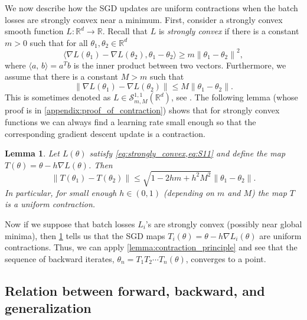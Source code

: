 \documentclass[10pt]{article} %
\theoremstyle{plain}
\newtheorem{lemma}[theorem]{Lemma}
\theoremstyle{definition}
\theoremstyle{remark}
\begin{document}
We now describe how the SGD updates are uniform contractions when the batch losses are strongly convex near a minimum.
First, consider a strongly convex smooth function $L:\mathbb{R}^d \to \mathbb{R}$. Recall that $L$ is \emph{strongly convex} if there is a constant $m>0$ such that for all $\theta_1,\theta_2 \in \mathbb{R}^d$
\begin{equation} \label{eq:strongly_convex}
    \langle \nabla L(\theta_1) - \nabla L(\theta_2), \theta_1-\theta_2 \rangle \geq m \left \| \theta_1-\theta_2 \right \|^2,
\end{equation}
where $\langle a, \,b\rangle = a^T b$ is the inner product between two vectors. Furthermore, we assume that there is a constant $M > m$ such that
\begin{equation}\label{eq:S11}
    \left \| \nabla L(\theta_1) - \nabla L(\theta_2) \right \| \leq M \left \| \theta_1-\theta_2 \right \|.
\end{equation}
This is sometimes denoted as $L \in \mathcal{S}_{m,M}^{1,1}(\mathbb{R}^d)$, see \cite{nesterov}.
The following lemma (whose proof is in \cref{appendix:proof_of_contraction}) shows that for strongly convex functions we can always find a learning rate small enough so that the corresponding gradient descent update is a contraction. 
\begin{lemma} \label{lem:contraction}
    Let $L(\theta)$ satisfy \cref{eq:strongly_convex,eq:S11} and define the map $T(\theta)=\theta-h\nabla L(\theta)$.
    Then
    \begin{equation*}
        \left \| T(\theta_1)-T(\theta_2) \right \| \leq \sqrt{1 - 2 h m + h^2 M^2} \left \| \theta_1-\theta_2 \right \|.
    \end{equation*}
    In particular, for small enough $h \in (0,1)$ (depending on $m$ and $M$) the map $T$ is a uniform contraction.
\end{lemma}


Now if we suppose that batch losses $L_i$'s are strongly convex (possibly near global minima), then \cref{lem:contraction} tells us that the SGD maps $T_i(\theta) = \theta - h\nabla L_i(\theta)$ are uniform contractions. Thus, we can apply \cref{lemma:contraction_principle} and see that the sequence of backward iterates, $\theta_n = T_1 T_2\cdots T_n(\theta)$, converges to a point.

 


\subsection{Relation between forward, backward, and generalization}
\end{document}
